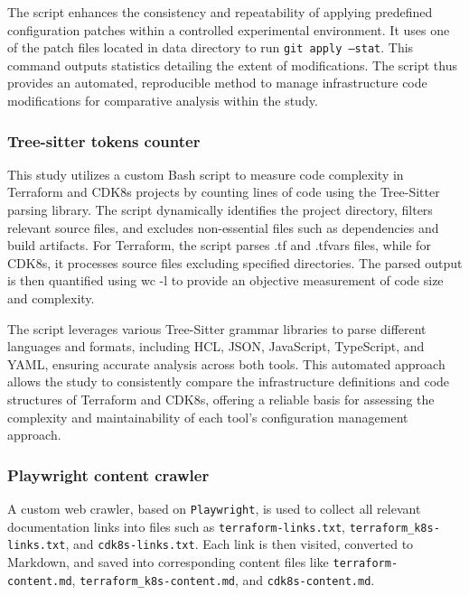 \documentclass{article}
\begin{document}
The script enhances the consistency and repeatability of applying predefined configuration patches within a controlled experimental environment.
It uses one of the patch files located in data directory to run \texttt{git apply --stat}. This command outputs statistics detailing the extent of modifications. 
The script thus provides an automated, reproducible method to manage infrastructure code modifications for comparative analysis within the study.

\subsubsection{Tree-sitter tokens counter}
\label{sec:treesitter-tokens-counter}

This study utilizes a custom Bash script to measure code complexity in Terraform and CDK8s projects by counting lines of code using the Tree-Sitter parsing library. The script dynamically identifies the project directory, filters relevant source files, and excludes non-essential files such as dependencies and build artifacts. For Terraform, the script parses .tf and .tfvars files, while for CDK8s, it processes source files excluding specified directories. The parsed output is then quantified using wc -l to provide an objective measurement of code size and complexity.

The script leverages various Tree-Sitter grammar libraries to parse different languages and formats, including HCL, JSON, JavaScript, TypeScript, and YAML, ensuring accurate analysis across both tools. This automated approach allows the study to consistently compare the infrastructure definitions and code structures of Terraform and CDK8s, offering a reliable basis for assessing the complexity and maintainability of each tool’s configuration management approach.

\subsubsection{Playwright content crawler}
\label{sec:playwright-content-crawler}

A custom web crawler, based on \texttt{Playwright}, is used to collect all relevant documentation links into files such as \texttt{terraform-links.txt}, \texttt{terraform\_k8s-links.txt}, and \texttt{cdk8s-links.txt}. Each link is then visited, converted to Markdown, and saved into corresponding content files like \texttt{terraform-content.md}, \texttt{terraform\_k8s-content.md}, and \texttt{cdk8s-content.md}. 
\end{document}
